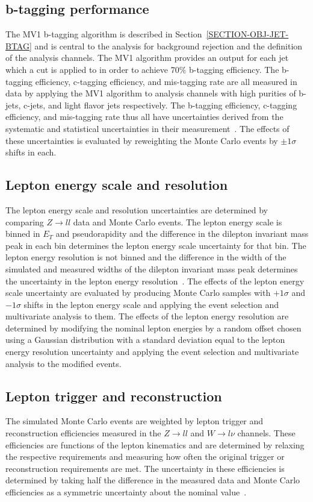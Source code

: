 \subsection{b-tagging performance}
\label{SECTION-RESULTS-SYSTEMATICS-TAGGING}
The MV1 b-tagging algorithm is described in Section~\ref{SECTION-OBJ-JET-BTAG} and is central to the analysis for background rejection and the definition of the analysis channels. The MV1 algorithm provides an output for each jet which a cut is applied to in order to achieve 70$\%$ b-tagging efficiency. The b-tagging efficiency, c-tagging efficiency, and mis-tagging rate are all measured in data by applying the MV1 algorithm to analysis channels with high purities of b-jets, c-jets, and light flavor jets respectively. The b-tagging efficiency, c-tagging efficiency, and mis-tagging rate thus all have uncertainties derived from the systematic and statistical uncertainties in their measurement~\cite{BTAGGING,CTAGGING,MISTAGGING}. The effects of these uncertainties is evaluated by reweighting the Monte Carlo events by $\pm 1 \sigma$ shifts in each.

\subsection{Lepton energy scale and resolution}
\label{SECTION-RESULTS-SYSTEMATICS-LEP}
The lepton energy scale and resolution uncertainties are determined by comparing $Z \to ll$ data and Monte Carlo events. The lepton energy scale is binned in $E_T$ and pseudorapidity and the difference in the dilepton invariant mass peak in each bin determines the lepton energy scale uncertainty for that bin. The lepton energy resolution is not binned and the difference in the width of the simulated and measured widths of the dilepton invariant mass peak determines the uncertainty in the lepton energy resolution~\cite{ELECTRONRECO,MUONRECO}. The effects of the lepton energy scale uncertainty are evaluated by producing Monte Carlo samples with $+1\sigma$ and $-1\sigma$ shifts in the lepton energy scale and applying the event selection and multivariate analysis to them. The effects of the lepton energy resolution are determined by modifying the nominal lepton energies by a random offset chosen using a Gaussian distribution with a standard deviation equal to the lepton energy resolution uncertainty  and applying the event selection and multivariate analysis to the modified events.

\subsection{Lepton trigger and reconstruction}
\label{SECTION-RESULTS-SYSTEMATICS-LEPRECO}
The simulated Monte Carlo events are weighted by lepton trigger and reconstruction efficiencies measured in the $Z \to ll$ and $W \to l\nu$ channels. These efficiencies are functions of the lepton kinematics and are determined by relaxing the respective requirements and measuring how often the original trigger or reconstruction requirements are met. The uncertainty in these efficiencies is determined by taking half the difference in the measured data and Monte Carlo efficiencies as a symmetric uncertainty about the nominal value~\cite{ELECTRONRECO,MUONRECO}.

